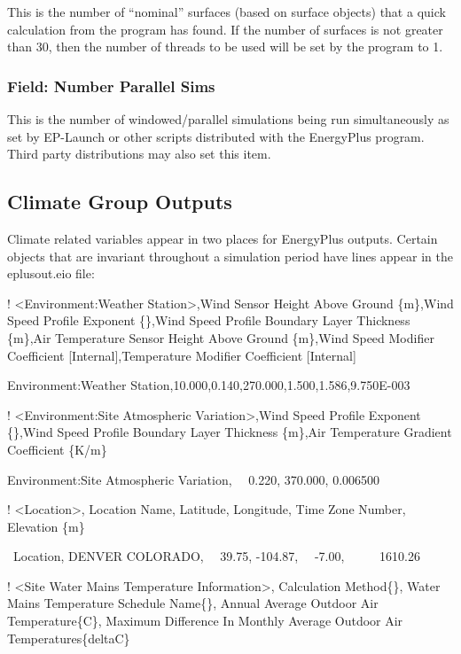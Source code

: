 This is the number of ``nominal'' surfaces (based on surface objects) that a quick calculation from the program has found. If the number of surfaces is not greater than 30, then the number of threads to be used will be set by the program to 1.

\subsubsection{Field: Number Parallel Sims}\label{field-number-parallel-sims}

This is the number of windowed/parallel simulations being run simultaneously as set by EP-Launch or other scripts distributed with the EnergyPlus program. Third party distributions may also set this item.

\subsection{Climate Group Outputs}\label{climate-group-outputs}

Climate related variables appear in two places for EnergyPlus outputs. Certain objects that are invariant throughout a simulation period have lines appear in the eplusout.eio file:

! \textless{}Environment:Weather Station\textgreater{},Wind Sensor Height Above Ground \{m\},Wind Speed Profile Exponent \{\},Wind Speed Profile Boundary Layer Thickness \{m\},Air Temperature Sensor Height Above Ground \{m\},Wind Speed Modifier Coefficient {[}Internal{]},Temperature Modifier Coefficient {[}Internal{]}

Environment:Weather Station,10.000,0.140,270.000,1.500,1.586,9.750E-003

! \textless{}Environment:Site Atmospheric Variation\textgreater{},Wind Speed Profile Exponent \{\},Wind Speed Profile Boundary Layer Thickness \{m\},Air Temperature Gradient Coefficient \{K/m\}

Environment:Site Atmospheric Variation,~~ 0.220, 370.000, 0.006500

! \textless{}Location\textgreater{}, Location Name, Latitude, Longitude, Time Zone Number, Elevation \{m\}

~Location, DENVER COLORADO,~~ 39.75, -104.87,~~ -7.00,~~~~~ 1610.26

! \textless{}Site Water Mains Temperature Information\textgreater{}, Calculation Method\{\}, Water Mains Temperature Schedule Name\{\}, Annual Average Outdoor Air Temperature\{C\}, Maximum Difference In Monthly Average Outdoor Air Temperatures\{deltaC\}

